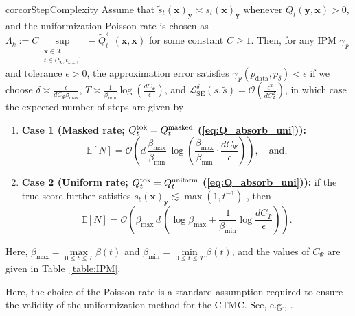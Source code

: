 \documentclass{article} %
\def\eqref#1{equation~\ref{#1}}
\newcommand{\LSE}{\mathcal{L}_{\mathrm{SE}}}
\renewcommand{\eqref}[1]{\textup{(\ref{#1})}}
\newcommand{\betamax}{\beta_{\mathrm{max}}}
\newcommand{\betamin}{\beta_{\mathrm{min}}}
\begin{document}
\begin{restatable}{cor}{corStepComplexity}\label{cor:StepComplexity}
    Assume that $\tilde{s}_{t}(\mathbf{x})_\mathbf{y} \asymp s_{t}(\mathbf{x})_\mathbf{y}$ whenever $Q_t(\mathbf{y}, \mathbf{x}) > 0$, and the uniformization Poisson rate is chosen as
    $\Lambda_k := C   \sup\limits_{\substack{\mathbf{x} \in \mathcal{X} \\ t \in (t_k, t_{k+1}]}} -\tilde{Q}^{\leftarrow}_t (\mathbf{x}, \mathbf{x})$
    for some constant $C\geq 1$. Then, for any IPM $\gamma_\Psi$ and tolerance $\epsilon > 0$, the approximation error satisfies
    $
    \gamma_\Psi(p_{\mathrm{data}}, \tilde{p}_\delta) < \epsilon
    $ if we choose $\delta \asymp \frac{\epsilon}{d C_\Psi \betamax }$, $T \asymp \frac{1}{\betamin} \log \left( \frac{d C_\Psi }{\epsilon} \right) $, and $\LSE^\delta(s, \tilde{s}) = \mathcal{O}(\frac{\epsilon^2}{d C_\Psi^2})$, in which case the expected number of steps are given by
    \begin{enumerate}
        \item \textbf{Case 1 (Masked rate; $Q^{\mathrm{tok}}_t=Q_t^{\rm masked}$ \eqref{eq:Q_absorb_uni}):}
        \[
        \mathbb{E}[N] = \mathcal{O}\left(d \, \frac{\betamax}{\beta_{\mathrm{min}}} \,  \log \left( \frac{\betamax}{\betamin}\cdot \frac{d C_\Psi}{\epsilon}  \right) \right),
        \quad \text{and,}
        \]
        \item \textbf{Case 2 (Uniform rate; $Q^{\mathrm{tok}}_t=Q_t^{\rm uniform}$ \eqref{eq:Q_absorb_uni}):} if the true score further satisfies $s_t(\mathbf{x})_\mathbf{y} \lesssim \max(1, t^{-1})$ \citep[following][Assumption~4.4]{ren2025discrete}, then
        \[
        \mathbb{E}[N] = \mathcal{O} \left( \betamax \, d \, \left( \log\betamax +  \frac{1}{\betamin} \log \frac{d C_\Psi}{\epsilon} \right) \right).
        \]
    \end{enumerate}
    Here, $\betamax = \max\limits_{0 \leq t \leq T} \beta(t)$ and $\betamin = \min\limits_{0 \leq t \leq T} \beta(t)$, and the values of $C_\Psi$ are  given in Table~\ref{table:IPM}. 
\end{restatable}

Here, the choice of the Poisson rate is a standard assumption required to ensure the validity of the uniformization method for the CTMC. See, e.g., \cite{grassmann1977transient,chen2025convergence}. 
\end{document}
